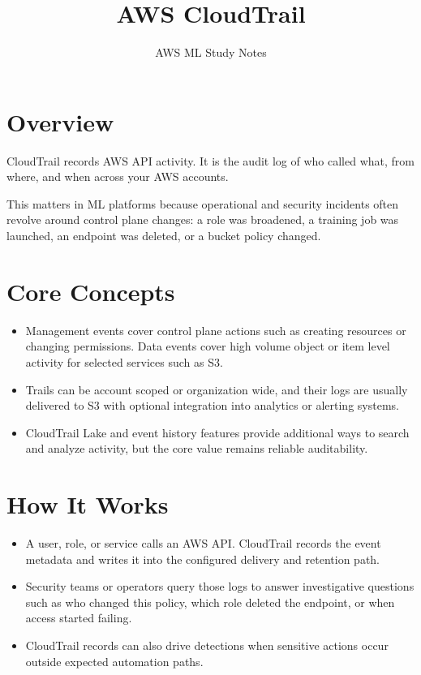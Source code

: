 \documentclass[10pt,twocolumn]{article}
\begin{document}
\title{\vspace{-1.6cm}AWS CloudTrail}
\author{AWS ML Study Notes}
\date{}
\maketitle
\small

\section*{Overview}
CloudTrail records AWS API activity. It is the audit log of who called what, from where, and when across your AWS accounts.

This matters in ML platforms because operational and security incidents often revolve around control plane changes: a role was broadened, a training job was launched, an endpoint was deleted, or a bucket policy changed.

\section*{Core Concepts}
\begin{itemize}
\item Management events cover control plane actions such as creating resources or changing permissions. Data events cover high volume object or item level activity for selected services such as S3.
\item Trails can be account scoped or organization wide, and their logs are usually delivered to S3 with optional integration into analytics or alerting systems.
\item CloudTrail Lake and event history features provide additional ways to search and analyze activity, but the core value remains reliable auditability.
\end{itemize}

\section*{How It Works}
\begin{itemize}
\item A user, role, or service calls an AWS API. CloudTrail records the event metadata and writes it into the configured delivery and retention path.
\item Security teams or operators query those logs to answer investigative questions such as who changed this policy, which role deleted the endpoint, or when access started failing.
\item CloudTrail records can also drive detections when sensitive actions occur outside expected automation paths.
\end{itemize}
\end{document}
